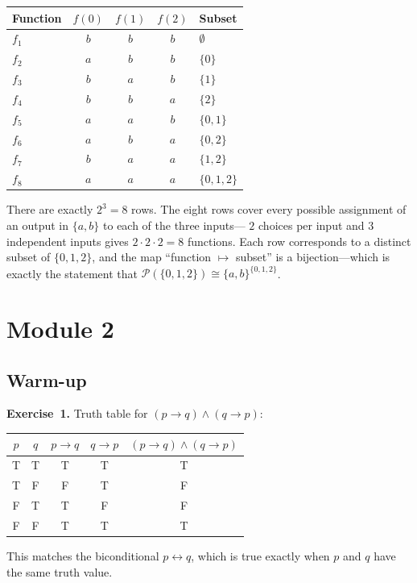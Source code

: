 \documentclass[11pt]{article}
\begin{document}
\begin{center}
\begin{tabular}{l|ccc|l}
\toprule
Function & $f(0)$ & $f(1)$ & $f(2)$ & Subset \\
\midrule
$f_1$ & $b$ & $b$ & $b$ & $\emptyset$ \\
$f_2$ & $a$ & $b$ & $b$ & $\{0\}$ \\
$f_3$ & $b$ & $a$ & $b$ & $\{1\}$ \\
$f_4$ & $b$ & $b$ & $a$ & $\{2\}$ \\
$f_5$ & $a$ & $a$ & $b$ & $\{0, 1\}$ \\
$f_6$ & $a$ & $b$ & $a$ & $\{0, 2\}$ \\
$f_7$ & $b$ & $a$ & $a$ & $\{1, 2\}$ \\
$f_8$ & $a$ & $a$ & $a$ & $\{0, 1, 2\}$ \\
\bottomrule
\end{tabular}
\end{center}
There are exactly $2^3 = 8$ rows.  The eight rows cover every possible
assignment of an output in $\{a, b\}$ to each of the three inputs---
$2$ choices per input and $3$ independent inputs gives $2 \cdot 2
\cdot 2 = 8$ functions.  Each row corresponds to a distinct subset of
$\{0, 1, 2\}$, and the map ``function $\mapsto$ subset'' is a
bijection---which is exactly the statement that $\mathcal{P}(\{0, 1, 2\})
\cong \{a, b\}^{\{0, 1, 2\}}$.

\section*{Module 2}

\subsection*{Warm-up}

\textbf{Exercise~1.}
Truth table for $(p \to q) \wedge (q \to p)$:

\begin{center}
\begin{tabular}{cc|c|c|c}
\toprule
$p$ & $q$ & $p \to q$ & $q \to p$ & $(p \to q) \wedge (q \to p)$ \\
\midrule
T & T & T & T & T \\
T & F & F & T & F \\
F & T & T & F & F \\
F & F & T & T & T \\
\bottomrule
\end{tabular}
\end{center}
This matches the biconditional $p \leftrightarrow q$, which is true exactly
when $p$ and $q$ have the same truth value.
\end{document}

